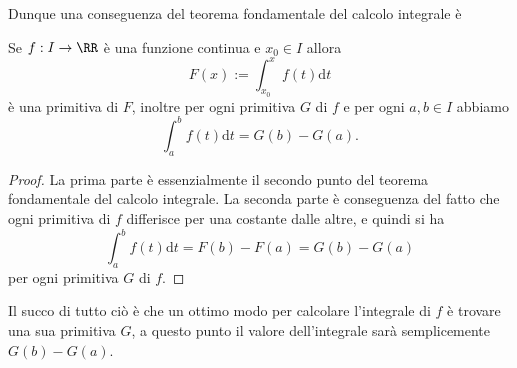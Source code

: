\documentclass[11pt]{scrartcl}
\newcommand{\dif}{\text{d}}
\begin{document}
	Dunque una conseguenza del teorema fondamentale del calcolo integrale è 
	\begin{corollary}
		Se $f:I\to\RR$ è una funzione continua e $x_0\in I$ allora
		$$F(x):=\int_{x_0}^x f(t)\dif t$$
		è una primitiva di $F$, inoltre per ogni primitiva $G$ di $f$ e per ogni $a,b\in I$ abbiamo
		$$\int_a^bf(t)\dif t=G(b)-G(a).$$
	\end{corollary}
	\begin{proof}
		La prima parte è essenzialmente il secondo punto del teorema fondamentale del calcolo integrale. La seconda parte è conseguenza del fatto che ogni primitiva di $f$ differisce per una costante dalle altre, e quindi si ha
		$$\int_a^bf(t)\dif t=F(b)-F(a)=G(b)-G(a)$$
		per ogni primitiva $G$ di $f$.
	\end{proof}
	Il succo di tutto ciò è che un ottimo modo per calcolare l'integrale di $f$  è trovare una sua primitiva $G$, a questo punto il valore dell'integrale sarà semplicemente $G(b)-G(a).$
\end{document}
